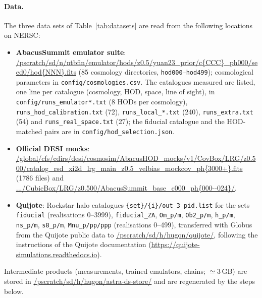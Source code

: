 \paragraph{Data.} The three data sets of Table~\ref{tab:datasets} are read from the following locations on NERSC:
\begin{itemize}
\item \textbf{AbacusSummit emulator suite}: \url{/pscratch/sd/n/ntbfin/emulator/hods/z0.5/yuan23_prior/c{CCC}_ph000/seed0/hod{NNN}.fits} (85 cosmology directories, \texttt{hod000}--\texttt{hod499}); cosmological parameters in \texttt{config/cosmologies.csv}. The catalogues measured are listed, one line per catalogue (cosmology, HOD, space, line of sight), in \texttt{config/runs\_emulator*.txt} (8 HODs per cosmology), \texttt{runs\_hod\_calibration.txt} (72), \texttt{runs\_local\_*.txt} (240), \texttt{runs\_extra.txt} (54) and \texttt{runs\_real\_space.txt} (27); the fiducial catalogue and the HOD-matched pairs are in \texttt{config/hod\_selection.json}.
\item \textbf{Official DESI mocks}: \url{/global/cfs/cdirs/desi/cosmosim/AbacusHOD_mocks/v1/CovBox/LRG/z0.500/catalog_rsd_xi2d_lrg_main_z0.5_velbias_mockcov_ph{3000+}.fits} (1786 files) and \url{.../CubicBox/LRG/z0.500/AbacusSummit_base_c000_ph{000--024}/}.
\item \textbf{Quijote}: Rockstar halo catalogues \texttt{\{set\}/\{i\}/out\_3\_pid.list} for the sets \texttt{fiducial} (realisations 0--3999), \texttt{fiducial\_ZA}, \texttt{Om\_p/m}, \texttt{Ob2\_p/m}, \texttt{h\_p/m}, \texttt{ns\_p/m}, \texttt{s8\_p/m}, \texttt{Mnu\_p/pp/ppp} (realisations 0--499), transferred with Globus from the Quijote public data to \url{/pscratch/sd/h/hugon/quijote/}, following the instructions of the Quijote documentation (\url{https://quijote-simulations.readthedocs.io}).
\end{itemize}
Intermediate products (measurements, trained emulators, chains; $\simeq3$\,GB) are stored in \url{/pscratch/sd/h/hugon/astra-ds-store/} and are regenerated by the steps below.

